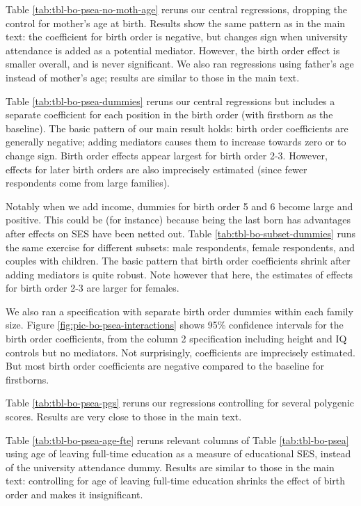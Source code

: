\documentclass[
]{article}
\begin{document}
Table \ref{tab:tbl-bo-psea-no-moth-age} reruns our central regressions,
dropping the control for mother's age at birth. Results show the same
pattern as in the main text: the coefficient for birth order is
negative, but changes sign when university attendance is added as a
potential mediator. However, the birth order effect is smaller overall,
and is never significant. We also ran regressions using father's age
instead of mother's age; results are similar to those in the main text.

Table \ref{tab:tbl-bo-psea-dummies} reruns our central regressions but
includes a separate coefficient for each position in the birth order
(with firstborn as the baseline). The basic pattern of our main result
holds: birth order coefficients are generally negative; adding mediators
causes them to increase towards zero or to change sign. Birth order
effects appear largest for birth order 2-3. However, effects for later
birth orders are also imprecisely estimated (since fewer respondents
come from large families).

Notably when we add income, dummies for birth order 5 and 6 become large
and positive. This could be (for instance) because being the last born
has advantages after effects on SES have been netted out. Table
\ref{tab:tbl-bo-subset-dummies} runs the same exercise for different
subsets: male respondents, female respondents, and couples with
children. The basic pattern that birth order coefficients shrink after
adding mediators is quite robust. Note however that here, the estimates
of effects for birth order 2-3 are larger for females.

We also ran a specification with separate birth order dummies within
each family size. Figure \ref{fig:pic-bo-psea-interactions} shows 95\%
confidence intervals for the birth order coefficients, from the column 2
specification including height and IQ controls but no mediators. Not
surprisingly, coefficients are imprecisely estimated. But most birth
order coefficients are negative compared to the baseline for firstborns.

Table \ref{tab:tbl-bo-psea-pgs} reruns our regressions controlling for
several polygenic scores. Results are very close to those in the main
text.

Table \ref{tab:tbl-bo-psea-age-fte} reruns relevant columns of Table
\ref{tab:tbl-bo-psea} using age of leaving full-time education as a
measure of educational SES, instead of the university attendance dummy.
Results are similar to those in the main text: controlling for age of
leaving full-time education shrinks the effect of birth order and makes
it insignificant.
\end{document}
